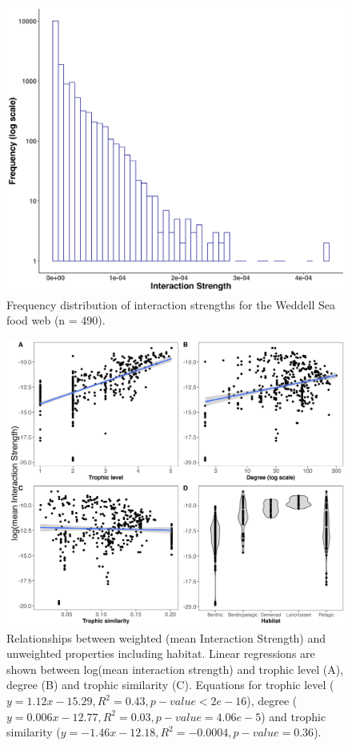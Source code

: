 \documentclass[gc, manuscript]{copernicus}
\begin{document}
\clearpage

\begin{figure}
\includegraphics[width=12cm]{Fig3_IntDist} \caption{Frequency distribution of interaction strengths for the Weddell Sea food web (n = 490).}\label{fig:unnamed-chunk-3}
\end{figure}

\clearpage

\begin{figure}
\includegraphics[width=12cm]{Fig4_LinReg} \caption{Relationships between weighted (mean Interaction Strength) and unweighted properties including habitat. Linear regressions are shown between log(mean interaction strength) and trophic level (A), degree (B) and trophic similarity (C). Equations for trophic level ($y = 1.12x - 15.29, R^2 = 0.43, p-value < 2e-16$), degree ($y = 0.006x - 12.77, R^2 = 0.03, p-value = 4.06e-5$) and trophic similarity ($y = -1.46x - 12.18, R^2 = -0.0004, p-value = 0.36$).}\label{fig:unnamed-chunk-4}
\end{figure}
\end{document}
